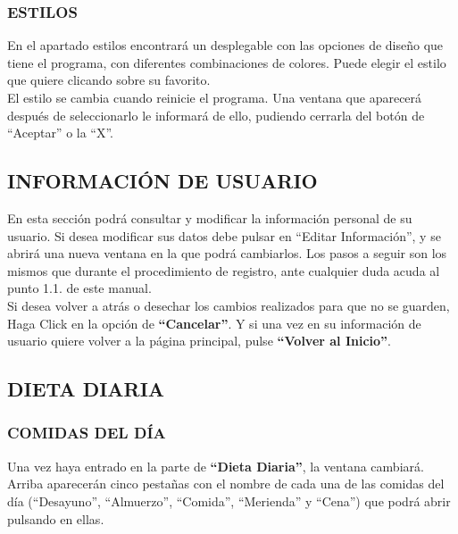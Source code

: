 \subsubsection{ESTILOS}
En el apartado estilos encontrará un desplegable con las opciones de diseño que tiene el programa, con diferentes combinaciones de colores. Puede elegir el estilo que quiere clicando sobre su favorito.\\
El estilo se cambia cuando reinicie el programa. Una ventana que aparecerá después de seleccionarlo le informará de ello, pudiendo cerrarla del botón de “Aceptar” o la “X”.
\subsection{INFORMACIÓN DE USUARIO}

En esta sección podrá consultar y modificar la información personal de su usuario. Si desea modificar sus datos debe pulsar en “Editar Información”, y se abrirá una nueva ventana en la que podrá cambiarlos. Los pasos a seguir son los mismos que durante el procedimiento de registro, ante cualquier duda acuda al punto 1.1. de este manual.\\
Si desea volver a atrás o desechar los cambios realizados para que no se guarden, Haga Click en la opción de \textbf{“Cancelar”}. Y si una vez en su información de usuario quiere volver a la página principal, pulse \textbf{“Volver al Inicio”}.
\subsection{DIETA DIARIA}
\subsubsection{COMIDAS DEL DÍA}
Una vez haya entrado en la parte de \textbf{“Dieta Diaria”}, la ventana cambiará. Arriba aparecerán cinco pestañas con el nombre de cada una de las comidas del día (“Desayuno”, “Almuerzo”, “Comida”, “Merienda” y “Cena”) que podrá abrir pulsando en ellas.\\

